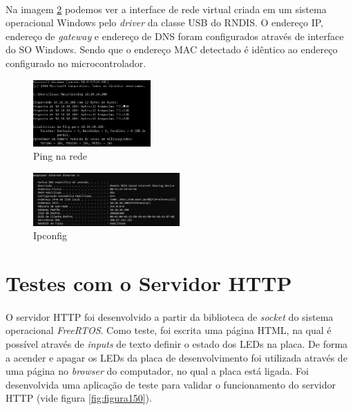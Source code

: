 \paragraph{} Na imagem \ref{fig:figura101} podemos ver a interface de rede virtual criada em um sistema operacional Windows pelo \textit{driver} da classe USB do RNDIS. O endereço IP, endereço de \textit{gateway} e endereço de DNS foram configurados através de interface do SO Windows. Sendo que o endereço MAC detectado é idêntico ao endereço configurado no microcontrolador.  

\begin{figure}[!ht]
	\centering
	\includegraphics[width=0.4\textwidth]{Figuras/ping.PNG}   
	\caption{Ping na rede}
	\label{fig:figura100}
\end{figure}

\begin{figure}[!ht]
	\centering
	\includegraphics[width=0.5\textwidth]{Figuras/ipconfig.PNG}   
	\caption{Ipconfig}
	\label{fig:figura101}
\end{figure}

\section{Testes com o Servidor HTTP}

\paragraph{} O servidor HTTP foi desenvolvido a partir da biblioteca de \textit{socket} do sistema operacional \textit{FreeRTOS}. Como teste, foi escrita uma página HTML, na qual é possível através de \textit{inputs} de texto definir o estado dos LEDs na placa. De forma a acender e apagar os LEDs da placa de desenvolvimento foi utilizada através de uma página no \textit{browser} do computador, no qual a placa está ligada.
Foi desenvolvida uma aplicação de teste para validar o funcionamento do servidor HTTP (vide figura \ref{fig:figura150}).  

